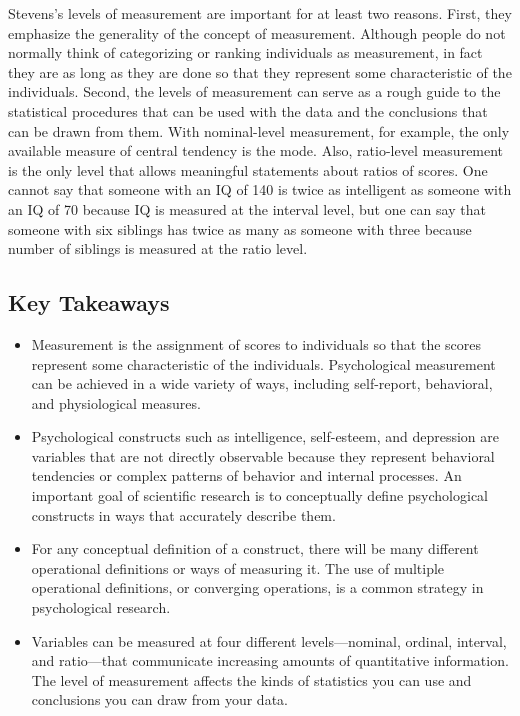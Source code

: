 Stevens's levels of measurement are important for at least two reasons. First, they emphasize the generality of the concept of measurement. Although people do not normally think of categorizing or ranking individuals as measurement, in fact they are as long as they are done so that they represent some characteristic of the individuals. Second, the levels of measurement can serve as a rough guide to the statistical procedures that can be used with the data and the conclusions that can be drawn from them. With nominal-level measurement, for example, the only available measure of central tendency is the mode. Also, ratio-level measurement is the only level that allows meaningful statements about ratios of scores. One cannot say that someone with an IQ of 140 is twice as intelligent as someone with an IQ of 70 because IQ is measured at the interval level, but one can say that someone with six siblings has twice as many as someone with three because number of siblings is measured at the ratio level.


\subsection{Key Takeaways}
\begin{fullwidth}
\begin{itemize}

\item  Measurement is the assignment of scores to individuals so that the scores represent some characteristic of the individuals. Psychological measurement can be achieved in a wide variety of ways, including self-report, behavioral, and physiological measures.
\item Psychological constructs such as intelligence, self-esteem, and depression are variables that are not directly observable because they represent behavioral tendencies or complex patterns of behavior and internal processes. An important goal of scientific research is to conceptually define psychological constructs in ways that accurately describe them.
\item For any conceptual definition of a construct, there will be many different operational definitions or ways of measuring it. The use of multiple operational definitions, or converging operations, is a common strategy in psychological research.
\item Variables can be measured at four different levels—nominal, ordinal, interval, and ratio—that communicate increasing amounts of quantitative information. The level of measurement affects the kinds of statistics you can use and conclusions you can draw from your data.

\end{itemize}
\end{fullwidth}

